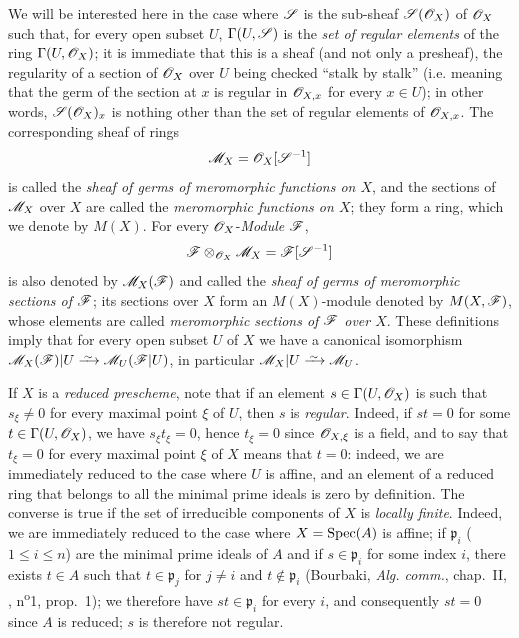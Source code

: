 \begin{env}[20.1.3]\label{IV.20.1.3}
We will be interested here in the case where $\mathscr{S}$ is the sub-sheaf $\mathscr{S}(\mathscr{O}_X)$ of $\mathscr{O}_X$ such that, for every open subset $U$, $\Gamma(U,\mathscr{S})$ is the \emph{set of regular elements} of the ring $\Gamma(U,\mathscr{O}_X)$; it is immediate that this is a sheaf (and not only a presheaf), the regularity of a section of $\mathscr{O}_X$ over $U$ being checked ``stalk by stalk'' (i.e. meaning that the germ of the section at $x$ is regular in $\mathscr{O}_{X,x}$ for every $x\in U$); in other words, $\mathscr{S}(\mathscr{O}_X)_x$ is nothing other than the set of regular elements of $\mathscr{O}_{X,x}$.
The corresponding sheaf of rings
\[
  \mathscr{M}_X=\mathscr{O}_X[\mathscr{S}^{-1}]
\]
is called the \emph{sheaf of germs of meromorphic functions on $X$}, and the sections of $\mathscr{M}_X$ over $X$ are called the \emph{meromorphic functions on $X$}; they form a ring, which we denote by $M(X)$.
For every $\mathscr{O}_X$-\emph{Module} $\mathscr{F}$,
\[
  \mathscr{F}\otimes_{\mathscr{O}_X}\mathscr{M}_X=\mathscr{F}[\mathscr{S}^{-1}]
\]
is also denoted by $\mathscr{M}_X(\mathscr{F})$ and called the \emph{sheaf of germs of meromorphic sections of $\mathscr{F}$}; its sections over $X$ form an $M(X)$-module denoted by $M(X,\mathscr{F})$, whose elements are called \emph{meromorphic sections of $\mathscr{F}$ over $X$}.
These definitions imply that for every open subset $U$ of $X$ we have a canonical isomorphism $\sh{M}_X(\sh{F})|U\simto\sh{M}_U(\sh{F}|U)$, in particular $\sh{M}_X|U\simto\sh{M}_U$.
\end{env}

\begin{env}[20.1.3.1]
\label{IV.20.1.3.1}
If $X$ is a \emph{reduced prescheme}, note that if an element $s\in\Gamma(U,\mathscr{O}_X)$ is such that $s_\xi\neq0$ for every maximal point $\xi$ of $U$, then $s$ is \emph{regular}.
Indeed, if $st=0$ for some $t\in\Gamma(U,\mathscr{O}_X)$, we have $s_\xi t_\xi=0$, hence $t_\xi=0$ since $\mathscr{O}_{X,\xi}$ is a field, and to say that $t_\xi=0$ for every maximal point $\xi$ of $X$ means that $t=0$: indeed, we are immediately reduced to the case where $U$ is affine, and an element of a reduced ring that belongs to all the minimal prime ideals is zero by definition.
The converse is true if the set of irreducible components of $X$ is \emph{locally finite}.
Indeed, we are immediately reduced to the case where $X=\operatorname{Spec}(A)$ is affine; if $\mathfrak p_i$ ($1\leq i\leq n$) are the minimal prime ideals of $A$ and if $s\in\mathfrak p_i$ for some index $i$, there exists $t\in A$ such that $t\in\mathfrak p_j$ for $j\neq i$ and $t\notin\mathfrak p_i$ (Bourbaki, \emph{Alg. comm.}, chap.~II, , n\textsuperscript{o}1, prop.~1); we therefore have $st\in\mathfrak p_i$ for every $i$, and consequently $st=0$ since $A$ is reduced; $s$ is therefore not regular.
\end{env}

